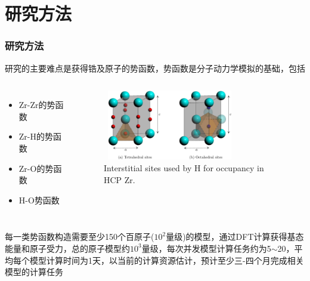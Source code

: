 \section{研究方法}
\begin{frame}
	\frametitle{研究方法}
研究的主要难点是获得锆及原子的势函数，势函数是分子动力学模拟的基础，包括
  \begin{columns}
\begin{itemize}
	\item $\mathrm{Zr}$-$\mathrm{Zr}$的势函数
	\item $\mathrm{Zr}$-$\mathrm{H}$的势函数
	\item $\mathrm{Zr}$-$\mathrm{O}$的势函数
	\item $\mathrm{H}$-$\mathrm{O}$势函数
\end{itemize}
\begin{figure}[!ht]
\centering
\vspace*{-0.05in}
\includegraphics[height=1.20in,width=2.30in,viewport=0 0 1316 735,clip]{Figures/Interstitial_sites-used-by-H-for-occupancy-in-hcp_Zr.png}
\caption{\tiny \textrm{Interstitial sites used by H for occupancy in HCP Zr.}}
\label{Fig:Interstitial_sites-used-by-H-for-occupancy-in-hcp_Zr}
\end{figure}
  \end{columns}
每一类势函数构造需要至少\textrm{150}个百原子($10^2$量级)的模型，通过\textrm{DFT}计算获得基态能量和原子受力，总的原子模型约$10^3$量级，每次并发模型计算任务约为\textrm{5$\sim$20}，平均每个模型计算时间为1天，以当前的计算资源估计，预计至少三-四个月完成相关模型的计算任务
\end{frame}

